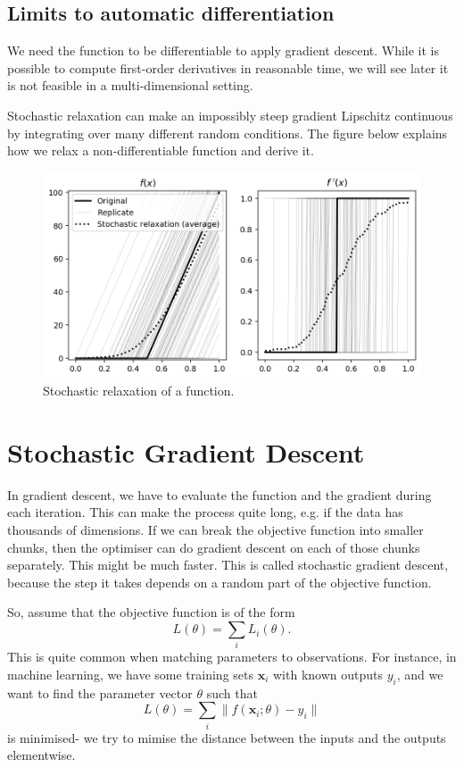 \documentclass[a4paper, openany]{memoir}
\begin{document}
\subsection{Limits to automatic differentiation}
We need the function to be differentiable to apply gradient descent. While it is possible to compute first-order derivatives in reasonable time, we will see later it is not feasible in a multi-dimensional setting.

Stochastic relaxation can make an impossibly steep gradient Lipschitz continuous by integrating over many different random conditions. The figure below explains how we relax a non-differentiable function and derive it.
\begin{figure}[H]
    \centering
    \includegraphics[scale=0.65]{src/4.30 stochastic relaxation.png}
    \caption{Stochastic relaxation of a function.}
\end{figure}
\newpage

\section{Stochastic Gradient Descent}
In gradient descent, we have to evaluate the function and the gradient during each iteration. This can make the process quite long, e.g. if the data has thousands of dimensions. If we can break the objective function into smaller chunks, then the optimiser can do gradient descent on each of those chunks separately. This might be much faster. This is called stochastic gradient descent, because the step it takes depends on a random part of the objective function.

So, assume that the objective function is of the form
\[L(\theta) = \sum_i L_i(\theta).\]
This is quite common when matching parameters to observations. For instance, in machine learning, we have some training sets $\mathbf{x}_i$ with known outputs $y_i$, and we want to find the parameter vector $\theta$ such that
\[L(\theta) = \sum_i \lVert f(\mathbf{x}_i; \theta) - y_i \rVert\]
is minimised- we try to mimise the distance between the inputs and the outputs elementwise.
\end{document}
